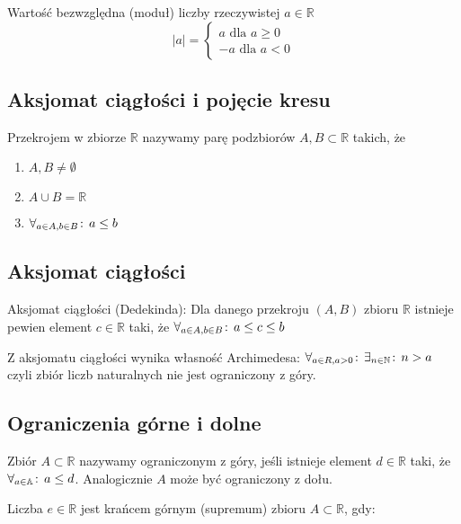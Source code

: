 \documentclass[9pt]{article}
\begin{document}
\begin{Def}
    Wartość bezwzględna (moduł) liczby rzeczywistej $a\in \mathbb{R}$ 
    \[
        |a| = 
        \left\{
            \begin{array}{c}
                a \text{ dla }  a \ge 0 \\
                -a \text{ dla }  a < 0
            \end{array}
        \right.
    \]
\end{Def}


\subsection{Aksjomat ciągłości i pojęcie kresu}

Przekrojem w zbiorze $\mathbb{R}$ nazywamy parę podzbiorów $A,B \subset \mathbb{R}$ takich, że
\begin{enumerate}
    \item $A, B \ne \emptyset$
    \item $A \cup B = \mathbb{R}$
    \item $\forall_{a\in A, b\in B} \! : \, a\le b$
\end{enumerate}

\subsection{Aksjomat ciągłości}

Aksjomat ciągłości (Dedekinda): Dla danego przekroju $(A,B)$ zbioru $\mathbb{R}$ istnieje pewien
element $c\in \mathbb{R}$ taki, że $\forall_{a\in A, b \in B} \! : \, a \le c \le b$

Z aksjomatu ciągłości wynika własność Archimedesa:
$\forall_{a\in R, a> 0} \! : \, \exists_{n \in \mathbb{N}} \! : \, n > a$
czyli zbiór liczb naturalnych nie jest ograniczony z góry.

\subsection{Ograniczenia górne i dolne}

\begin{Def}
    Zbiór $A\subset \mathbb{R}$ nazywamy ograniczonym z góry, jeśli istnieje element $d \in
    \mathbb{R}$ taki, że $\forall_{a \in \mathbb{A}} \! : \, a \le d$. Analogicznie $A$ może być
    ograniczony z dołu.
\end{Def}

Liczba $e \in \mathbb{R}$ jest krańcem górnym (supremum) zbioru $A \subset \mathbb{R}$, gdy:
\end{document}
